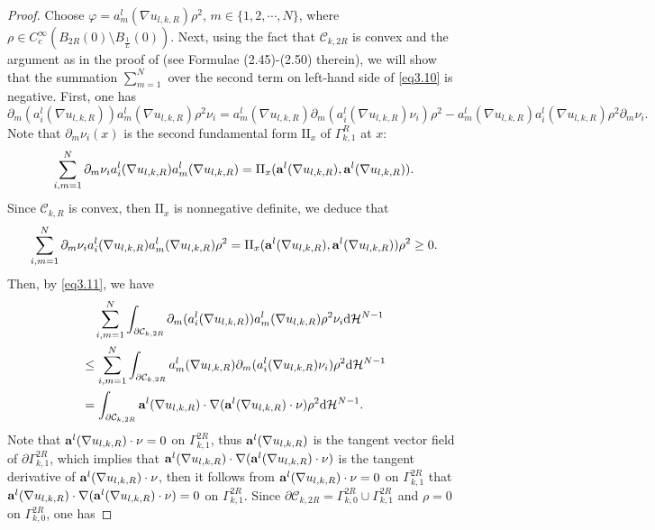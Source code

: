 \documentclass[12pt]{amsart}
\theoremstyle{definition}
\theoremstyle{remark}
\theoremstyle{conclusion}
\theoremstyle{conjecture}
\numberwithin{equation}{section}
\begin{document}
\begin{proof}
Choose $\varphi=a^l_m(\nabla u_{l,k,R})\rho ^2$, $m\in\{1,2,\cdots,N\}$, where $\rho \in C_c^{\infty}(B_{2R}(0)\setminus B_{\frac{1}{L}}(0))$. Next, using the fact that $\mathcal{C}_{k,2R}$ is convex and the argument as in the proof of \cite[Proposition 2.8]{CFR} (see Formulae (2.45)-(2.50) therein), we will show that the summation $\sum\limits_{m=1}^{N}$ over the second term on left-hand side of \eqref{eq3.10} is negative. First, one has
\begin{equation}\label{eq3.11}
    \partial_m (a^l_i(\nabla u_{l,k,R}))a^l_m(\nabla u_{l,k,R})\rho ^2\nu_i=a_m^l(\nabla u_{l,k,R})\partial_m (a^l_i(\nabla u_{l,k,R})\nu_i)\rho^2-a_m^l(\nabla u_{l,k,R})a_i^l(\nabla u_{l,k,R})\rho^2\partial_m\nu_i.
\end{equation}
Note that $\partial_m\nu_i(x)$ is the second fundamental form $\mathrm{II}_x$ of $\Gamma^{R}_{k,1}$ at $x$:
$$\sum\limits_{i,m=1}^{N}\partial_m\nu_i a^l_i(\nabla u_{l,k,R})a^l_m(\nabla u_{l,k,R})=\mathrm{II}_x({\bf{a}}^l(\nabla u_{l,k,R}),{\bf{a}}^l(\nabla u_{l,k,R})).$$
Since $\mathcal{C}_{k,R}$ is convex, then $\mathrm{II}_x$ is nonnegative definite, we deduce that
\begin{equation*}
    \sum\limits_{i,m=1}^{N}\partial_m\nu_i a^l_i(\nabla u_{l,k,R})a^l_m(\nabla u_{l,k,R})\rho^2=\mathrm{II}_x({\bf{a}}^l(\nabla u_{l,k,R}),{\bf{a}}^l(\nabla u_{l,k,R}))\rho^2\geq0.
\end{equation*}
Then, by \eqref{eq3.11}, we have
\begin{equation*}
    \begin{aligned}
        &\quad \sum\limits_{i,m=1}^{N}\int_{\partial\mathcal{C}_{k,2R}}\partial_m (a^l_i(\nabla u_{l,k,R}))a^l_m(\nabla u_{l,k,R})\rho ^2\nu_i\mathrm{d}\mathcal{H}^{N-1} \\
        &\leq \sum\limits_{i,m=1}^{N}\int_{\partial\mathcal{C}_{k,2R}}a_m^l(\nabla u_{l,k,R})\partial_m (a^l_i(\nabla u_{l,k,R})\nu_i)\rho^2\mathrm{d}\mathcal{H}^{N-1}\\
        &=\int_{\partial\mathcal{C}_{k,2R}}{\bf{a}}^l(\nabla u_{l,k,R})\cdot\nabla({\bf{a}}^l(\nabla u_{l,k,R})\cdot\nu)\rho^2\mathrm{d}\mathcal{H}^{N-1}.
    \end{aligned}
\end{equation*}
Note that ${\bf{a}}^l(\nabla u_{l,k,R})\cdot\nu=0$ on $\Gamma_{k,1}^{2R}$, thus ${\bf{a}}^l(\nabla u_{l,k,R})$ is the tangent vector field of $\partial\Gamma_{k,1}^{2R}$, which implies that ${\bf{a}}^l(\nabla u_{l,k,R})\cdot\nabla({\bf{a}}^l(\nabla u_{l,k,R})\cdot\nu)$ is the tangent derivative of ${\bf{a}}^l(\nabla u_{l,k,R})\cdot\nu$, then it follows from ${\bf{a}}^l(\nabla u_{l,k,R})\cdot\nu=0$ on $\Gamma_{k,1}^{2R}$ that ${\bf{a}}^l(\nabla u_{l,k,R})\cdot\nabla({\bf{a}}^l(\nabla u_{l,k,R})\cdot\nu)=0$ on $\Gamma_{k,1}^{2R}$. Since $\partial\mathcal{C}_{k,2R}=\Gamma_{k,0}^{2R}\cup\Gamma_{k,1}^{2R}$ and $\rho=0$ on $\Gamma_{k,0}^{2R}$, one has

\end{proof}
\end{document}
